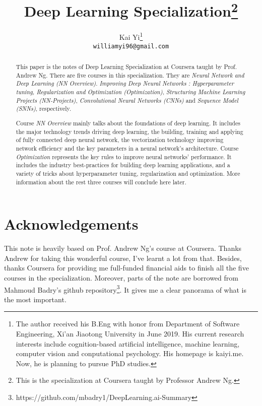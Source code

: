 \documentclass{article}
\title{Deep Learning Specialization\thanks{This is the specialization at Coursera taught by Professor Andrew Ng.}}
\author{
    Kai Yi\thanks{The author received his B.Eng with honor from Department of Software Engineering, Xi'an Jiaotong University in June 2019. His current research interests include cognition-based artificial intelligence, machine learning, computer vision and conputational psychology. His homepage is kaiyi.me. Now, he is planning to pursue PhD studies.}\\
  \texttt{williamyi96@gmail.com} \\

}
\begin{document}
\maketitle

\begin{abstract}



This paper is the notes of Deep Learning Specialization at Coursera taught by Prof. Andrew Ng. There are five courses in this specialization. They are \textit{Neural Network and Deep Learning (NN Overview)}. \textit{Improving Deep Neural Networks : Hyperparameter tuning, Regularization and Optimization (Optimization)}, \textit{Structuring Machine Learning Projects (NN-Projects)}, \textit{Convolutional Neural Networks (CNNs)} and \textit{Sequence Model (SNNs)}, respectively. 

Course \textit{NN Overview} mainly talks about the foundations of deep learning. It includes the major technology trends driving deep learning, the  building, training and applying of fully connected deep neural network, the vectorization technology improving network efficiency and the key parameters in a neural network's architecture. Course \textit{Optimization} represents the key rules to improve neural networks' performance. It includes the industry best-practices for building deep learning applications, and a variety of tricks about hyperparameter tuning, regularization and optimization. More information about the rest three courses will conclude here later.

\end{abstract}  

\newpage
\tableofcontents
\newpage
\listoffigures
\newpage
\listoftables
\newpage



% 
%   
% 





% 

% 

\section*{Acknowledgements}
This note is heavily based on Prof. Andrew Ng's course at Coursera. Thanks Andrew for taking this wonderful course, I've learnt a lot from that. Besides, thanks Coursera for providing me full-funded financial aids to finish all the five courses in the specialization. Moreover, parts of the note are borrowed from Mahmoud Badry's github repository\footnote{https://github.com/mbadry1/DeepLearning.ai-Summary}. It gives me a clear panorama of what is the most important.

  

% 
\end{document}
